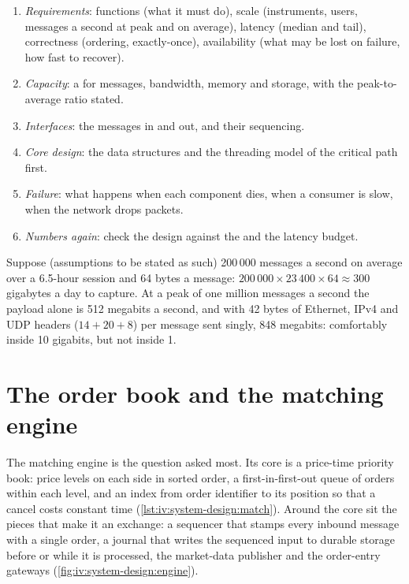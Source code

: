 \begin{method}\label{met:iv:system-design:method}
\begin{enumerate}
\item \emph{Requirements}: functions (what it must do), scale (instruments, users, messages a second at peak and on average),
latency (median and tail), correctness (ordering, exactly-once), availability (what may be lost on failure, how fast to recover).
\item \emph{Capacity}: a  for messages, bandwidth, memory and storage, with the peak-to-average ratio stated.
\item \emph{Interfaces}: the messages in and out, and their sequencing.
\item \emph{Core design}: the data structures and the threading model of the critical path first.
\item \emph{Failure}: what happens when each component dies, when a consumer is slow, when the network drops packets.
\item \emph{Numbers again}: check the design against the  and the latency budget.
\end{enumerate}
\end{method}

\begin{example}\label{ex:iv:system-design:feed}
Suppose (assumptions to be stated as such) 200\,000 messages a second on average over a 6.5-hour session and 64 bytes a
message: $200\,000 \times 23\,400 \times 64 \approx 300$ gigabytes a day to capture. At a peak of one million messages a second
the payload alone is 512 megabits a second, and with 42 bytes of Ethernet, IPv4 and UDP headers ($14 + 20 + 8$) per message sent singly,
848 megabits: comfortably inside 10 gigabits, but not inside 1.
\end{example}

\section{The order book and the matching engine}

The matching engine is the question asked most. Its core is a price-time priority book: price levels on each side in sorted
order, a first-in-first-out queue of orders within each level, and an index from order identifier to its position so that a
cancel costs constant time (\cref{lst:iv:system-design:match}). Around the core sit the pieces that make it an exchange: a
sequencer that stamps every inbound message with a single order, a journal that writes the sequenced input to durable storage
before or while it is processed, the market-data publisher and the order-entry gateways (\cref{fig:iv:system-design:engine}).

